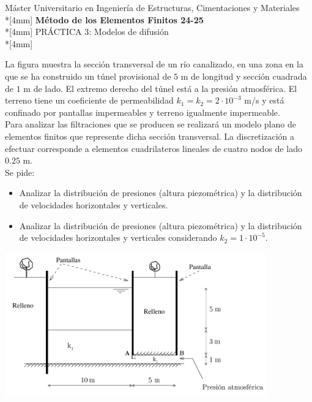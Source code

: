 \documentclass[a4paper,12pt]{article}
\begin{document}
\mbox{}\vspace*{-45mm}

{\centering
{\small\sc 
Máster Universitario en Ingeniería de Estructuras, Cimentaciones y Materiales}\\*[4mm]
{\Large\bf Método de los Elementos Finitos 24-25}\\*[4mm]
PRÁCTICA 3: Modelos de difusión \\*[4mm]
}

\vspace{3mm}

\noindent
La figura muestra la sección transversal de un río canalizado, en una zona en la que se ha construido un túnel provisional de $5$ m de longitud y sección cuadrada de $1$ m de lado. El extremo derecho del túnel está a la presión atmosférica. El terreno tiene un coeficiente de permeabilidad $k_1=k_2=2\cdot10^{-3}$ m/s y está confinado por pantallas impermeables y terreno igualmente impermeable.\\

Para analizar las filtraciones que se producen se realizará un modelo plano de elementos finitos que represente dicha sección transversal. La discretización a efectuar corresponde a elementos cuadrilateros lineales de cuatro
nodos de lado $0.25$ m.\\

Se pide:

\begin{itemize}
\item Analizar la distribución de presiones (altura piezométrica) y la distribución de velocidades horizontales y verticales.
\item Analizar la distribución de presiones (altura piezométrica) y la distribución de velocidades horizontales y verticales considerando $k_2=1\cdot 10^{-5}$.
\end{itemize}



\begin{center}
\includegraphics[width=0.85\textwidth]{practi2_b}
\end{center}
\end{document}
